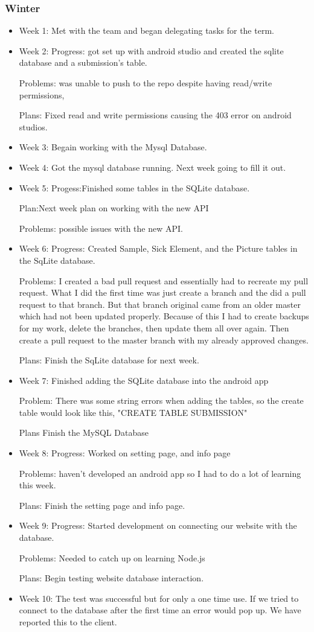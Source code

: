 \documentclass[onecolumn, draftclsnofoot,10pt, compsoc]{IEEEtran}
\begin{document}
 \subsubsection{Winter}
 \begin{itemize}
 \item Week 1: Met with the team and began delegating tasks for the term.
 \item Week 2: Progress: got set up with android studio and created the sqlite database and a submission's table.

Problems: was unable to push to the repo despite having read/write permissions,

Plans: Fixed read and write permissions causing the 403 error on android studios.
     \item Week 3: Begain working with the Mysql Database.
     \item Week 4: Got the mysql database running. Next week going to fill it out.
     \item Week 5: Progess:Finished some tables in the SQLite database. 
     
     Plan:Next week plan on working with the new API 

    Problems: possible issues with the new API.
     \item Week 6: Progress: Created Sample, Sick Element, and the Picture tables in the SqLite database.

Problems: I created a bad pull request and essentially had to recreate my pull request. What I did the first time was just create a branch and the did a pull request to that branch. But that branch original came from an older master which had not been updated properly. Because of this I had to create backups for my work, delete the branches, then update them all over again. Then create a pull request to the master branch with my already approved changes.

Plans: Finish the SqLite database for next week.
     \item Week 7: Finished adding the SQLite database into the android app

Problem: There was some string errors when adding the tables, so the create table would look like this, "CREATE TABLE SUBMISSION"

Plans Finish the MySQL Database
     \item Week 8: Progress: Worked on setting page, and info page

Problems: haven't developed an android app so I had to do a lot of learning this week.

Plans: Finish the setting page and info page.
     \item Week 9: Progress: Started development on connecting our website with the database.

Problems: Needed to catch up on learning Node.js

Plans: Begin testing website database interaction.
     \item Week 10: The test was successful but for only a one time use. If we tried to connect to the database after the first time an error would pop up. We have reported this to the client.
 \end{itemize}
\end{document}
